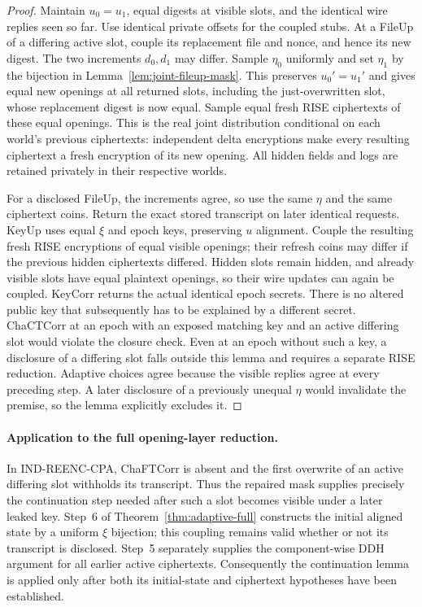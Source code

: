 \begin{proof}
Maintain $u_0=u_1$, equal digests at visible slots, and the identical wire replies seen so far. Use identical private offsets for the coupled stubs. At a FileUp of a differing active slot, couple its replacement file and nonce, and hence its new digest. The two increments $d_0,d_1$ may differ. Sample $\eta_0$ uniformly and set $\eta_1$ by the bijection in Lemma~\ref{lem:joint-fileup-mask}. This preserves $u_0'=u_1'$ and gives equal new openings at all returned slots, including the just-overwritten slot, whose replacement digest is now equal. Sample equal fresh RISE ciphertexts of these equal openings. This is the real joint distribution conditional on each world's previous ciphertexts: independent delta encryptions make every resulting ciphertext a fresh encryption of its new opening. All hidden fields and logs are retained privately in their respective worlds.

For a disclosed FileUp, the increments agree, so use the same $\eta$ and the same ciphertext coins. Return the exact stored transcript on later identical requests. KeyUp uses equal $\xi$ and epoch keys, preserving $u$ alignment. Couple the resulting fresh RISE encryptions of equal visible openings; their refresh coins may differ if the previous hidden ciphertexts differed. Hidden slots remain hidden, and already visible slots have equal plaintext openings, so their wire updates can again be coupled. KeyCorr returns the actual identical epoch secrets. There is no altered public key that subsequently has to be explained by a different secret. ChaCTCorr at an epoch with an exposed matching key and an active differing slot would violate the closure check. Even at an epoch without such a key, a disclosure of a differing slot falls outside this lemma and requires a separate RISE reduction. Adaptive choices agree because the visible replies agree at every preceding step. A later disclosure of a previously unequal $\eta$ would invalidate the premise, so the lemma explicitly excludes it.
\end{proof}

\paragraph{Application to the full opening-layer reduction.}
In IND-REENC-CPA, ChaFTCorr is absent and the first overwrite of an active differing slot withholds its transcript. Thus the repaired mask supplies precisely the continuation step needed after such a slot becomes visible under a later leaked key. Step~6 of Theorem~\ref{thm:adaptive-full} constructs the initial aligned state by a uniform $\xi$ bijection; this coupling remains valid whether or not its transcript is disclosed. Step~5 separately supplies the component-wise DDH argument for all earlier active ciphertexts. Consequently the continuation lemma is applied only after both its initial-state and ciphertext hypotheses have been established.

